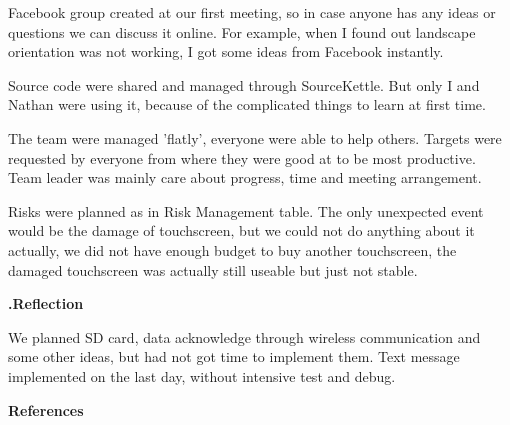\documentclass[a4paper,notitlepage,10pt]{report}
\newcommand{\tab}{\hspace{0.75cm}}
\newcommand{\fontHeading}{\fontsize{12pt}{13.2pt}\selectfont}
\newcommand{\fontBody}{\fontsize{10pt}{11pt}\selectfont}
\newcounter{sections}
\begin{document}
\begin{multicols}{2}
Facebook group created at our first meeting, so in case anyone has any ideas or questions we can discuss it online. For example, when I found out landscape orientation was not working, I got some ideas from Facebook instantly.
\vspace{6pt}

Source code were shared and managed through SourceKettle. But only I and Nathan were using it, because of the complicated things to learn at first time.
\vspace{6pt}

The team were managed 'flatly', everyone were able to help others. Targets were requested by everyone from where they were good at to be most productive. Team leader was mainly care about progress, time and meeting arrangement.
\vspace{6pt}

Risks were planned as in Risk Management table. The only unexpected event would be the damage of touchscreen, but we could not do anything about it actually, we did not have enough budget to buy another touchscreen, the damaged touchscreen was actually still useable but just not stable.
\vspace{10pt}

\fontHeading
{}
\textbf{\thesections.\tab Reflection}
\vspace{10pt}

\fontBody
We planned SD card, data acknowledge through wireless communication and some other ideas, but had not got time to implement them. Text message implemented on the last day, without intensive test and debug.
\vspace{10pt}

\fontHeading
\textbf{References}
\vspace{10pt}


\end{multicols}
\end{document}
